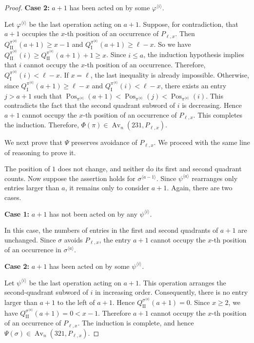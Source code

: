 \documentclass[11pt]{article}
\begin{document}
\begin{proof}
\noindent \textbf{Case 2:} $a+1$ has been acted on by some
$\varphi^{\langle i\rangle}$.

Let $\varphi^{\langle i\rangle}$ be the last operation acting on $a+1$.
Suppose, for contradiction, that $a+1$ occupies the $x$-th position
of an occurrence of $P_{\ell,x}$. Then
$Q_{\mathrm{II}}^{\pi^{\langle a\rangle}}(a+1)\geq x-1$ and
$Q_{\mathrm I}^{\pi^{\langle a\rangle}}(a+1)\geq\ell-x$.
So we have 
$
Q_{\mathrm{II}}^{\pi^{\langle a\rangle}}(i)
\geq
Q_{\mathrm{II}}^{\pi^{\langle a\rangle}}(a+1)+1
\geq x$.
Since $i\leq a$, the induction hypothesis implies that $i$ cannot
occupy the $x$-th position of an occurrence. Therefore,
$Q_{\mathrm I}^{\pi^{\langle a\rangle}}(i)<\ell-x$.
If $x=\ell$, the last inequality is already impossible. Otherwise,
since
$Q_{\mathrm I}^{\pi^{\langle a\rangle}}(a+1)\geq\ell-x$ and
$Q_{\mathrm I}^{\pi^{\langle a\rangle}}(i)<\ell-x$,
there exists an entry $j>a+1$ such that
$\operatorname{Pos}_{\pi^{\langle a\rangle}}(a+1)
<
\operatorname{Pos}_{\pi^{\langle a\rangle}}(j)
<
\operatorname{Pos}_{\pi^{\langle a\rangle}}(i)$.
This contradicts the fact that the
second quadrant subword of $i$ is decreasing. 
Hence $a+1$ cannot
occupy the $x$-th position of an occurrence of $P_{\ell,x}$.
This completes the induction. Therefore, $\Phi(\pi)\in\operatorname{Av}_n(231,P_{\ell,x})$.

We next prove that $\Psi$ preserves avoidance of $P_{\ell,x}$. 
We proceed with the same line of reasoning to prove it.

The position of $1$ does not change, and neither do its
first and second quadrant counts. 
Now suppose the assertion holds
for $\sigma^{\langle a-1\rangle}$. Since
$\psi^{\langle a\rangle}$ rearranges only entries larger than $a$,
it remains only to consider $a+1$.
Again, there are two cases.

\noindent \textbf{Case 1:} $a+1$ has not been acted on by any
$\psi^{\langle i\rangle}$.

In this case, the numbers of entries in the first and second quadrants
of $a+1$ are unchanged. Since $\sigma$ avoids $P_{\ell,x}$, the entry
$a+1$ cannot occupy the $x$-th position of an occurrence in
$\sigma^{\langle a\rangle}$.

\noindent \textbf{Case 2:} $a+1$ has been acted on by some
$\psi^{\langle i\rangle}$.

Let $\psi^{\langle i\rangle}$ be the last operation acting on $a+1$.
This operation arranges the second-quadrant subword of $i$ in
increasing order. Consequently, there is no entry larger than $a+1$
to the left of $a+1$. Hence
$Q_{\mathrm{II}}^{\sigma^{\langle a\rangle}}(a+1)=0$.
Since $x\geq2$, we have
$Q_{\mathrm{II}}^{\sigma^{\langle a\rangle}}(a+1)
=0<x-1$.
Therefore $a+1$ cannot occupy the $x$-th position of an occurrence of
$P_{\ell,x}$.
The induction is complete, and hence
$\Psi(\sigma)\in\operatorname{Av}_n(321,P_{\ell,x})$.
\end{proof}
\end{document}
